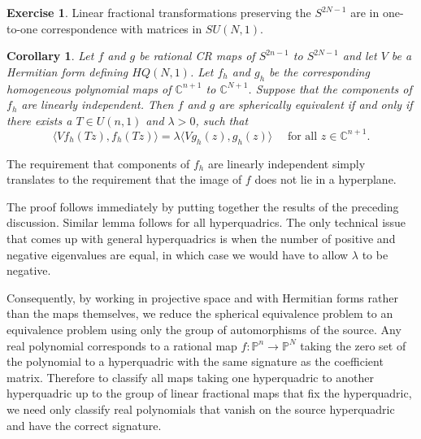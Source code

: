 \documentclass[12pt,openany]{book}
\newcommand{\C}{{\mathbb{C}}}
\newcommand{\bP}{{\mathbb{P}}}
\theoremstyle{plain}
\newtheorem{cor}[thm]{Corollary}
\theoremstyle{remark}
\theoremstyle{definition}
\theoremstyle{exercise}
\newtheorem{exercise}{Exercise}[section]
\theoremstyle{example}
\begin{document}
\begin{exercise}
Linear fractional transformations preserving the $S^{2N-1}$ are in
one-to-one correspondence with matrices in $SU(N,1)$.
\end{exercise}

\begin{cor}
Let $f$ and $g$ be rational CR maps of $S^{2n-1}$ to $S^{2N-1}$
and let $V$ be a Hermitian form defining $HQ(N,1)$.
Let $f_h$ and $g_h$ be the corresponding homogeneous polynomial
maps of $\C^{n+1}$ to $\C^{N+1}$.
Suppose that the components of $f_h$ are linearly independent.
Then $f$ and
$g$ are spherically equivalent if and only if there exists a $T \in U(n,1)$
and
$\lambda > 0$, such that
\begin{equation} \label{cor2eq}
\langle V f_h(T z) , f_h(T z) \rangle = \lambda \langle V
g_h(z) , g_h(z) \rangle \quad \text{ for all $z \in \C^{n+1}$}.
\end{equation}
\end{cor}

The requirement that components of $f_h$ are linearly independent simply
translates to the requirement that the image of $f$ does not lie in a
hyperplane.

The proof follows immediately by putting together the results of
the preceding discussion.  Similar lemma follows for all hyperquadrics.  The
only technical issue that comes up with general hyperquadrics is 
when the number of positive and negative eigenvalues are equal, in which
case we would have to allow $\lambda$ to be negative.

Consequently, by working in projective space and with 
Hermitian forms rather than the maps themselves, we reduce the
spherical equivalence problem to an equivalence problem using
only the group of automorphisms of the source.
Any real polynomial corresponds to a rational map $f \colon \bP^n \to \bP^N$
taking the zero set of the polynomial to a hyperquadric with the same
signature as the coefficient matrix.
Therefore to classify all maps taking one hyperquadric to another
hyperquadric up to the group of linear fractional maps that fix the
hyperquadric, we need only classify real polynomials that
vanish on the source hyperquadric and have the correct signature.
\end{document}
